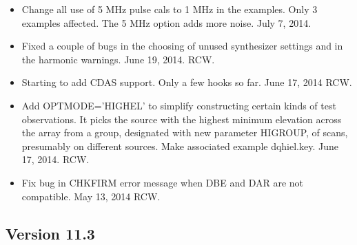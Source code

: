 \documentclass{report}
\begin{document}
\begin{itemize}
\item Change all use of 5 MHz pulse cals to 1 MHz in the examples.
Only 3 examples affected.  The 5 MHz option adds more noise.
July 7, 2014.

\item Fixed a couple of bugs in the choosing of unused synthesizer 
settings and in the harmonic warnings.  June 19, 2014.  RCW.

\item Starting to add CDAS support.  Only a few hooks so far. 
June 17, 2014  RCW.

\item Add OPTMODE='HIGHEL' to simplify constructing certain kinds of
test observations.  It picks the source with the highest minimum elevation
across the array from a group, designated with new parameter HIGROUP,
of scans, presumably on different sources.  Make associated
example dqhiel.key.  June 17, 2014.  RCW.

\item Fix bug in CHKFIRM error message when DBE and DAR are not compatible.
May 13, 2014  RCW.

\end{itemize}

\subsection{\label{SSEC:VER_11.3}Version 11.3}
\end{document}
